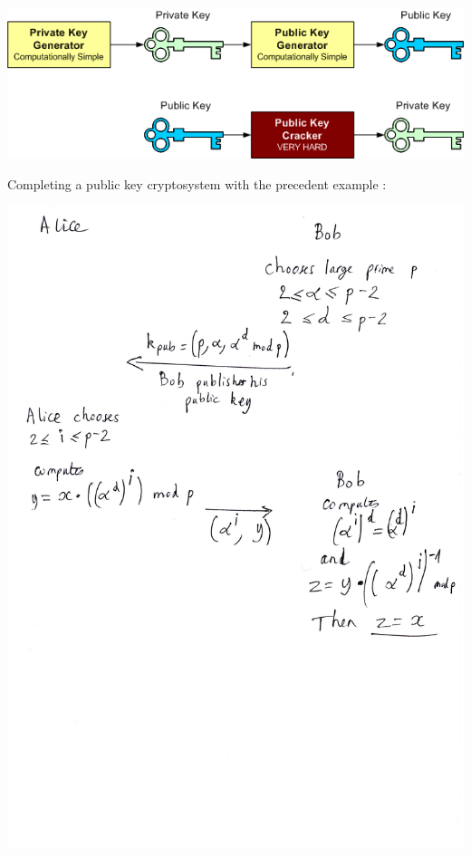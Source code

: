 \documentclass[compress]{beamer}
\theoremstyle{definition}
\theoremstyle{definition}
\theoremstyle{definition}
\theoremstyle{remark}
\theoremstyle{remark}
\theoremstyle{definition}
\theoremstyle{definition}
\theoremstyle{definition}
\theoremstyle{definition}
\theoremstyle{definition}
\theoremstyle{remark}
\theoremstyle{remark}
\theoremstyle{remark}
\theoremstyle{remark}
\begin{document}
				\begin{frame}
					\begin{center}\includegraphics[scale=1.2]{./generation}\end{center}
				\end{frame}
				\begin{frame}
					Completing a public key cryptosystem with the precedent example :
					
					\begin{center}\includegraphics[scale=0.2]{./elgamal}\end{center}
				\end{frame}
\end{document}
